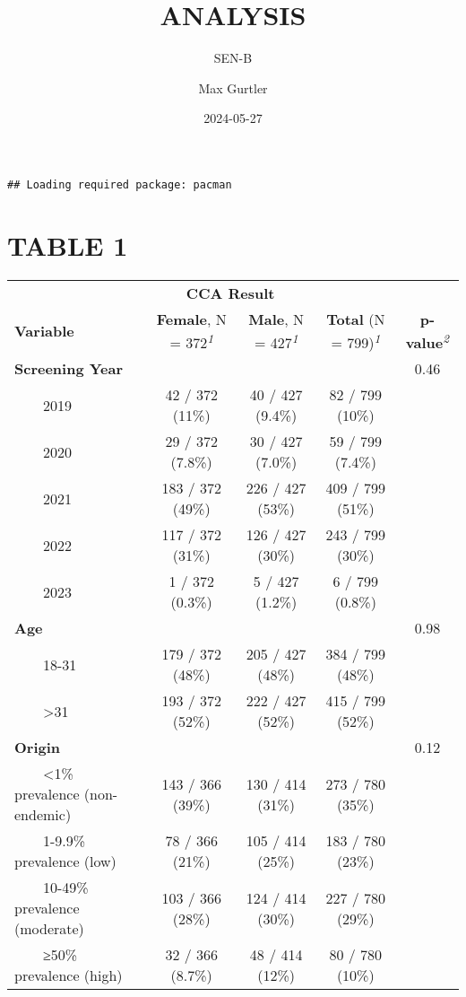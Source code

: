 \documentclass[
]{article}
\title{ANALYSIS}
\subtitle{SEN-B}
\author{Max Gurtler}
\date{2024-05-27}
\begin{document}
\maketitle

\begin{verbatim}
## Loading required package: pacman
\end{verbatim}

\section{TABLE 1}\label{table-1}

\setlength{\LTpost}{0mm}
\begin{longtable}{lcccc}
\toprule
 & \multicolumn{2}{c}{\textbf{CCA Result}} &  &  \\ 
\cmidrule(lr){2-3}
\textbf{Variable} & \textbf{Female}, N = 372\textsuperscript{\textit{1}} & \textbf{Male}, N = 427\textsuperscript{\textit{1}} & \textbf{Total} (N = 799)\textsuperscript{\textit{1}} & \textbf{p-value}\textsuperscript{\textit{2}} \\ 
\midrule\addlinespace[2.5pt]
\textbf{Screening Year} &  &  &  & 0.46 \\ 
    2019 & 42 / 372 (11\%) & 40 / 427 (9.4\%) & 82 / 799 (10\%) &  \\ 
    2020 & 29 / 372 (7.8\%) & 30 / 427 (7.0\%) & 59 / 799 (7.4\%) &  \\ 
    2021 & 183 / 372 (49\%) & 226 / 427 (53\%) & 409 / 799 (51\%) &  \\ 
    2022 & 117 / 372 (31\%) & 126 / 427 (30\%) & 243 / 799 (30\%) &  \\ 
    2023 & 1 / 372 (0.3\%) & 5 / 427 (1.2\%) & 6 / 799 (0.8\%) &  \\ 
\textbf{Age} &  &  &  & 0.98 \\ 
    18-31 & 179 / 372 (48\%) & 205 / 427 (48\%) & 384 / 799 (48\%) &  \\ 
    >31 & 193 / 372 (52\%) & 222 / 427 (52\%) & 415 / 799 (52\%) &  \\ 
\textbf{Origin} &  &  &  & 0.12 \\ 
    <1\% prevalence (non-endemic) & 143 / 366 (39\%) & 130 / 414 (31\%) & 273 / 780 (35\%) &  \\ 
    1-9.9\% prevalence (low) & 78 / 366 (21\%) & 105 / 414 (25\%) & 183 / 780 (23\%) &  \\ 
    10-49\% prevalence (moderate) & 103 / 366 (28\%) & 124 / 414 (30\%) & 227 / 780 (29\%) &  \\ 
    ≥50\% prevalence (high) & 32 / 366 (8.7\%) & 48 / 414 (12\%) & 80 / 780 (10\%) &  \\ 

\end{longtable}
\end{document}
